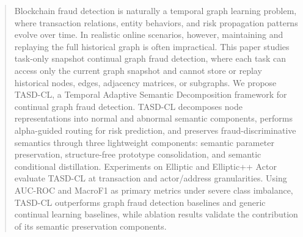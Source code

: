 \begin{abstract}
Blockchain fraud detection is naturally a temporal graph learning problem, where transaction relations, entity behaviors, and risk propagation patterns evolve over time. In realistic online scenarios, however, maintaining and replaying the full historical graph is often impractical. This paper studies task-only snapshot continual graph fraud detection, where each task can access only the current graph snapshot and cannot store or replay historical nodes, edges, adjacency matrices, or subgraphs. We propose TASD-CL, a Temporal Adaptive Semantic Decomposition framework for continual graph fraud detection. TASD-CL decomposes node representations into normal and abnormal semantic components, performs alpha-guided routing for risk prediction, and preserves fraud-discriminative semantics through three lightweight components: semantic parameter preservation, structure-free prototype consolidation, and semantic conditional distillation. Experiments on Elliptic and Elliptic++ Actor evaluate TASD-CL at transaction and actor/address granularities. Using AUC-ROC and MacroF1 as primary metrics under severe class imbalance, TASD-CL outperforms graph fraud detection baselines and generic continual learning baselines, while ablation results validate the contribution of its semantic preservation components.
\end{abstract}
